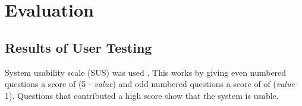 \section{Evaluation}

\subsection{Results of User Testing}

System usability scale (SUS) was used \cite{SUS}. This works by giving even numbered questions a score of (5 - \emph{value}) and odd numbered questions a score of of (\emph{value}-1). Questions that contributed a high score show that the system is usable.   
